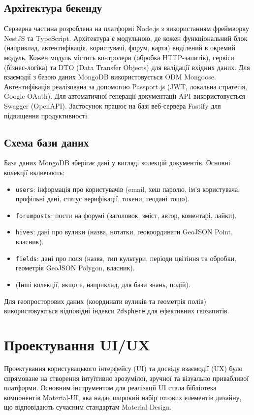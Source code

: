 \subsection{Архітектура бекенду}
Серверна частина розроблена на платформі Node.js з використанням фреймворку NestJS та TypeScript. Архітектура є модульною, де кожен функціональний блок (наприклад, автентифікація, користувачі, форум, карта) виділений в окремий модуль. Кожен модуль містить контролери (обробка HTTP-запитів), сервіси (бізнес-логіка) та DTO (Data Transfer Objects) для валідації вхідних даних. Для взаємодії з базою даних MongoDB використовується ODM Mongoose. Автентифікація реалізована за допомогою Passport.js (JWT, локальна стратегія, Google OAuth). Для автоматичної генерації документації API використовується Swagger (OpenAPI). Застосунок працює на базі веб-сервера Fastify для підвищення продуктивності.

\subsection{Схема бази даних}
База даних MongoDB зберігає дані у вигляді колекцій документів. Основні колекції включають:
\begin{itemize}
    \item \texttt{users}: інформація про користувачів (email, хеш паролю, ім'я користувача, профільні дані, статус верифікації, токени, геодані тощо).
    \item \texttt{forumposts}: пости на форумі (заголовок, зміст, автор, коментарі, лайки).
    \item \texttt{hives}: дані про вулики (назва, нотатки, геокоординати GeoJSON Point, власник).
    \item \texttt{fields}: дані про поля (назва, тип культури, періоди цвітіння та обробки, геометрія GeoJSON Polygon, власник).
    \item (Інші колекції, якщо є, наприклад, для бази знань, подій).
\end{itemize}
Для геопросторових даних (координати вуликів та геометрія полів) використовуються відповідні індекси \texttt{2dsphere} для ефективних геозапитів.

\section{Проектування UI/UX}
\label{sec:ui_ux}
Проектування користувацького інтерфейсу (UI) та досвіду взаємодії (UX) було спрямоване на створення інтуїтивно зрозумілої, зручної та візуально привабливої платформи. Основним інструментом для реалізації UI стала бібліотека компонентів Material-UI, яка надає широкий набір готових елементів дизайну, що відповідають сучасним стандартам Material Design. 

